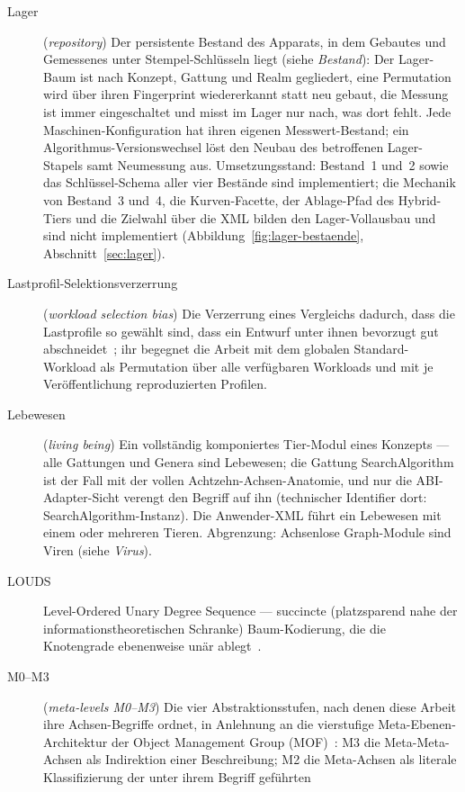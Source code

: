 \begin{description}
  \item[Lager] (\emph{repository}) Der persistente Bestand des Apparats, in dem Gebautes und
  Gemessenes unter Stempel-Schlüsseln liegt (siehe \emph{Bestand}): Der Lager-Baum ist nach
  Konzept, Gattung und Realm gegliedert, eine Permutation wird über ihren Fingerprint wiedererkannt
  statt neu gebaut, die Messung ist immer eingeschaltet und misst im Lager nur nach, was dort
  fehlt. Jede Maschinen-Konfiguration hat ihren eigenen Messwert-Bestand; ein
  Algorithmus-Versionswechsel löst den Neubau des betroffenen Lager-Stapels samt Neumessung aus.
  Umsetzungsstand: Bestand~1 und~2 sowie das Schlüssel-Schema aller vier Bestände sind implementiert;
  die Mechanik von Bestand~3 und~4, die Kurven-Facette, der Ablage-Pfad des Hybrid-Tiers und die
  Zielwahl über die XML bilden den Lager-Vollausbau und sind nicht implementiert (Abbildung~\ref{fig:lager-bestaende},
  Abschnitt~\ref{sec:lager}).
  \item[Lastprofil-Selektionsverzerrung] (\emph{workload selection bias}) Die Verzerrung eines
  Vergleichs dadurch, dass die Lastprofile so gewählt sind, dass ein Entwurf unter ihnen bevorzugt
  gut abschneidet~\cite{blackburn2016truth}; ihr begegnet die Arbeit mit dem globalen
  Standard-Workload als Permutation über alle verfügbaren Workloads und mit je Veröffentlichung
  reproduzierten Profilen.
  \item[Lebewesen] (\emph{living being}) Ein vollständig komponiertes Tier-Modul eines Konzepts ---
  alle Gattungen und Genera sind Lebewesen; die Gattung SearchAlgorithm ist der Fall mit der vollen
  Achtzehn-Achsen-Anatomie, und nur die ABI-Adapter-Sicht verengt den Begriff auf ihn (technischer
  Identifier dort: SearchAlgorithm-Instanz). Die Anwender-XML führt ein Lebewesen mit einem oder
  mehreren Tieren. Abgrenzung: Achsenlose Graph-Module sind Viren (siehe \emph{Virus}).
  \item[LOUDS] Level-Ordered Unary Degree Sequence --- succincte (platzsparend nahe der
  informationstheoretischen Schranke) Baum-Kodierung, die die Knotengrade ebenenweise unär
  ablegt~\cite{jacobson1989louds}.
  \item[M0--M3] (\emph{meta-levels M0--M3}) Die vier Abstraktionsstufen, nach denen diese Arbeit
  ihre Achsen-Begriffe ordnet, in Anlehnung an die vierstufige Meta-Ebenen-Architektur der Object
  Management Group (MOF)~\cite{omg2016mof}: M3 die Meta-Meta-Achsen als Indirektion einer
  Beschreibung; M2 die Meta-Achsen als literale Klassifizierung der unter ihrem Begriff geführten

\end{description}
